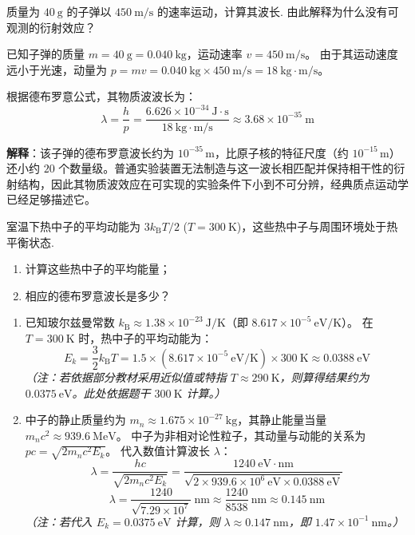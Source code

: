 \begin{exercise}\label{ex:23.2}
质量为 $40 \ \mathrm{g}$ 的子弹以 $450 \ \mathrm{m/s}$ 的速率运动，计算其波长. 由此解释为什么没有可观测的衍射效应？
\end{exercise}
\begin{solution}
已知子弹的质量 $m = 40 \ \mathrm{g} = 0.040 \ \mathrm{kg}$，运动速率 $v = 450 \ \mathrm{m/s}$。
由于其运动速度远小于光速，动量为 $p = mv = 0.040 \ \mathrm{kg} \times 450 \ \mathrm{m/s} = 18 \ \mathrm{kg \cdot m/s}$。

根据德布罗意公式，其物质波波长为：
$$ \lambda = \frac{h}{p} = \frac{6.626 \times 10^{-34} \ \mathrm{J \cdot s}}{18 \ \mathrm{kg \cdot m/s}} \approx 3.68 \times 10^{-35} \ \mathrm{m} $$

\textbf{解释}：该子弹的德布罗意波长约为 $10^{-35}\,\mathrm{m}$，比原子核的特征尺度（约 $10^{-15}\,\mathrm{m}$）还小约 $20$ 个数量级。普通实验装置无法制造与这一波长相匹配并保持相干性的衍射结构，因此其物质波效应在可实现的实验条件下小到不可分辨，经典质点运动学已经足够描述它。
\end{solution}

\begin{exercise}\label{ex:23.3}
室温下热中子的平均动能为 $3k_{\mathrm{B}}T/2$ ($T = 300 \ \mathrm{K}$)，这些热中子与周围环境处于热平衡状态.
\begin{enumerate}
  \item[(a)] 计算这些热中子的平均能量；
  \item[(b)] 相应的德布罗意波长是多少？
\end{enumerate}
\end{exercise}
\begin{solution}
\begin{enumerate}
    \item[(a)] 已知玻尔兹曼常数 $k_{\mathrm{B}} \approx 1.38 \times 10^{-23} \ \mathrm{J/K}$（即 $8.617 \times 10^{-5} \ \mathrm{eV/K}$）。
    在 $T = 300 \ \mathrm{K}$ 时，热中子的平均动能为：
    $$ E_k = \frac{3}{2} k_{\mathrm{B}} T = 1.5 \times (8.617 \times 10^{-5} \ \mathrm{eV/K}) \times 300 \ \mathrm{K} \approx 0.0388 \ \mathrm{eV} $$
    \textit{（注：若依据部分教材采用近似值或特指 $T \approx 290 \ \mathrm{K}$，则算得结果约为 $0.0375 \ \mathrm{eV}$。此处依据题干 $300 \ \mathrm{K}$ 计算。）}

    \item[(b)] 中子的静止质量约为 $m_n \approx 1.675 \times 10^{-27} \ \mathrm{kg}$，其静止能量当量 $m_n c^2 \approx 939.6 \ \mathrm{MeV}$。
    中子为非相对论性粒子，其动量与动能的关系为 $pc = \sqrt{2 m_n c^2 E_k}$。
    代入数值计算波长 $\lambda$：
    $$ \lambda = \frac{hc}{\sqrt{2 m_n c^2 E_k}} = \frac{1240 \ \mathrm{eV \cdot nm}}{\sqrt{2 \times 939.6 \times 10^6 \ \mathrm{eV} \times 0.0388 \ \mathrm{eV}}} $$
    $$ \lambda = \frac{1240}{\sqrt{7.29 \times 10^7}} \ \mathrm{nm} \approx \frac{1240}{8538} \ \mathrm{nm} \approx 0.145 \ \mathrm{nm} $$
    \textit{（注：若代入 $E_k = 0.0375 \ \mathrm{eV}$ 计算，则 $\lambda \approx 0.147 \ \mathrm{nm}$，即 $1.47 \times 10^{-1} \ \mathrm{nm}$。）}
\end{enumerate}
\end{solution}

